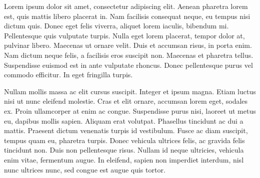 \documentclass[article]{ojbs}  %
\begin{document}
Lorem ipsum dolor sit amet, consectetur adipiscing elit. Aenean pharetra lorem est, quis mattis libero placerat in. Nam facilisis consequat neque, eu tempus nisi dictum quis. Donec eget felis viverra, aliquet lorem iaculis, bibendum mi. Pellentesque quis vulputate turpis. Nulla eget lorem placerat, tempor dolor at, pulvinar libero. Maecenas ut ornare velit. Duis et accumsan risus, in porta enim. Nam dictum neque felis, a facilisis eros suscipit non. Maecenas et pharetra tellus. Suspendisse euismod est in ante vulputate rhoncus. Donec pellentesque purus vel commodo efficitur. In eget fringilla turpis.

Nullam mollis massa ac elit cursus suscipit. Integer et ipsum magna. Etiam luctus nisi ut nunc eleifend molestie. Cras et elit ornare, accumsan lorem eget, sodales ex. Proin ullamcorper at enim ac congue. Suspendisse purus nisi, laoreet ut metus eu, dapibus mollis sapien. Aliquam erat volutpat. Phasellus tincidunt ac dui a mattis. Praesent dictum venenatis turpis id vestibulum. Fusce ac diam suscipit, tempus quam eu, pharetra turpis. Donec vehicula ultrices felis, ac gravida felis tincidunt non. Duis non pellentesque risus. Nullam id neque ultricies, vehicula enim vitae, fermentum augue. In eleifend, sapien non imperdiet interdum, nisl nunc ultrices nunc, sed congue est augue quis tortor.

\nocite{*}



\end{document}
